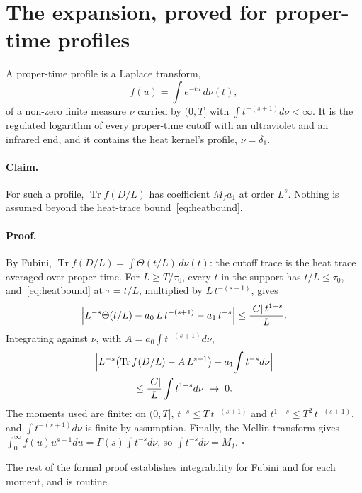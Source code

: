 \documentclass[aps,prd,reprint,amsmath,amssymb,superscriptaddress,nofootinbib]{revtex4-2}
\begin{document}
\section{The expansion, proved for proper-time profiles}
\label{app:abelian}

A proper-time profile is a Laplace transform,
\begin{equation}
  f(u)=\int e^{-tu}\,d\nu(t),
\end{equation}
of a non-zero finite measure $\nu$ carried by $(0,T]$ with $\int t^{-(s+1)}d\nu<\infty$. It
is the regulated logarithm of every proper-time cutoff with an ultraviolet and an infrared
end, and it contains the heat kernel's profile, $\nu=\delta_1$.

\paragraph{Claim.} For such a profile, $\operatorname{Tr}f(D/L)$ has coefficient $M_f a_1$
at order $L^s$. Nothing is assumed beyond the heat-trace bound~\eqref{eq:heatbound}.

\paragraph{Proof.}
By Fubini, $\operatorname{Tr}f(D/L)=\int\Theta(t/L)\,d\nu(t)$: the cutoff trace is the heat
trace averaged over proper time. For $L\ge T/\tau_0$, every $t$ in the support has
$t/L\le\tau_0$, and~\eqref{eq:heatbound} at $\tau=t/L$, multiplied by $L\,t^{-(s+1)}$,
gives
\begin{equation}
  \Bigl|L^{-s}\Theta(t/L)-a_0\,L\,t^{-(s+1)}-a_1\,t^{-s}\Bigr|\le \frac{|C|\,t^{1-s}}{L}.
\end{equation}
Integrating against $\nu$, with $A=a_0\int t^{-(s+1)}d\nu$,
\begin{multline}
  \Bigl|L^{-s}\bigl(\operatorname{Tr}f(D/L)-A\,L^{s+1}\bigr)-a_1\!\int t^{-s}d\nu\Bigr|\\
  \le\frac{|C|}{L}\int t^{1-s}d\nu\;\to\;0 .
\end{multline}
The moments used are finite: on $(0,T]$, $t^{-s}\le T\,t^{-(s+1)}$ and
$t^{1-s}\le T^2\,t^{-(s+1)}$, and $\int t^{-(s+1)}d\nu$ is finite by assumption. Finally,
the Mellin transform gives $\int_0^\infty f(u)u^{s-1}du=\Gamma(s)\int t^{-s}d\nu$, so
$\int t^{-s}d\nu=M_f$. \hfill$\square$

\noindent The rest of the formal proof establishes integrability for Fubini and for each
moment, and is routine.
\end{document}

